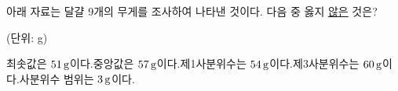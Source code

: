 아래 자료는 달걀 9개의 무게를 조사하여 나타낸 것이다. 다음 중 옳지 \underline{않은} 것은?\par{\raggedleft\small (단위: g)\par}
\begin{choicesii}{최솟값은 $51\mkern3mu \mathrm{g}$이다.}{중앙값은 $57\mkern3mu \mathrm{g}$이다.}{제1사분위수는 $54\mkern3mu \mathrm{g}$이다.}{제3사분위수는 $60\mkern3mu \mathrm{g}$이다.}{사분위수 범위는 $3\mkern3mu \mathrm{g}$이다.}\end{choicesii}
